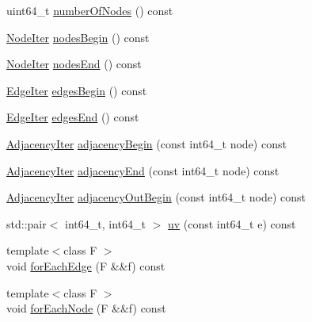 \begin{DoxyCompactItemize}
uint64\+\_\+t \hyperlink{classnifty_1_1graph_1_1UndirectedGraph_a6c6acc627c6a90269c06fb34a8c1973d}{number\+Of\+Nodes} () const 
\item 
\hyperlink{classnifty_1_1graph_1_1UndirectedGraph_aac54e4ad3a525489e9b29c1bd4c92c88}{Node\+Iter} \hyperlink{classnifty_1_1graph_1_1UndirectedGraph_ad343f62b74b5b2ea9d05a3b85a4efc4f}{nodes\+Begin} () const 
\item 
\hyperlink{classnifty_1_1graph_1_1UndirectedGraph_aac54e4ad3a525489e9b29c1bd4c92c88}{Node\+Iter} \hyperlink{classnifty_1_1graph_1_1UndirectedGraph_a67c4ce1c91980e9ec31aab1376e5db65}{nodes\+End} () const 
\item 
\hyperlink{classnifty_1_1graph_1_1UndirectedGraph_aa37a0dc690ad1257d5eb5105e7d66bba}{Edge\+Iter} \hyperlink{classnifty_1_1graph_1_1UndirectedGraph_adde9dd3a77b87b946acf4b44177d6f89}{edges\+Begin} () const 
\item 
\hyperlink{classnifty_1_1graph_1_1UndirectedGraph_aa37a0dc690ad1257d5eb5105e7d66bba}{Edge\+Iter} \hyperlink{classnifty_1_1graph_1_1UndirectedGraph_ae4c6a06e1ffc88a967c10da6c24a6b88}{edges\+End} () const 
\item 
\hyperlink{classnifty_1_1graph_1_1UndirectedGraph_adecb4597d23d097b08c2c03a106bc57b}{Adjacency\+Iter} \hyperlink{classnifty_1_1graph_1_1UndirectedGraph_a3158c45f6b045f886bd2b3bb98921d86}{adjacency\+Begin} (const int64\+\_\+t node) const 
\item 
\hyperlink{classnifty_1_1graph_1_1UndirectedGraph_adecb4597d23d097b08c2c03a106bc57b}{Adjacency\+Iter} \hyperlink{classnifty_1_1graph_1_1UndirectedGraph_aee5f776e07d2902e36fe5a8e258cb3fc}{adjacency\+End} (const int64\+\_\+t node) const 
\item 
\hyperlink{classnifty_1_1graph_1_1UndirectedGraph_adecb4597d23d097b08c2c03a106bc57b}{Adjacency\+Iter} \hyperlink{classnifty_1_1graph_1_1UndirectedGraph_ac8f9e2e6aff947622a48a875f3c33b15}{adjacency\+Out\+Begin} (const int64\+\_\+t node) const 
\item 
std\+::pair$<$ int64\+\_\+t, int64\+\_\+t $>$ \hyperlink{classnifty_1_1graph_1_1UndirectedGraph_a3f39f306b8f1e66812abfded1415ae38}{uv} (const int64\+\_\+t e) const 
\item 
{\footnotesize template$<$class F $>$ }\\void \hyperlink{classnifty_1_1graph_1_1UndirectedGraph_a521eb0c379b3c0f3a14c30dddcec4715}{for\+Each\+Edge} (F \&\&f) const 
\item 
{\footnotesize template$<$class F $>$ }\\void \hyperlink{classnifty_1_1graph_1_1UndirectedGraph_a6b04c2efc92ed8e43661a3d3067e7454}{for\+Each\+Node} (F \&\&f) const 

\end{DoxyCompactItemize}
